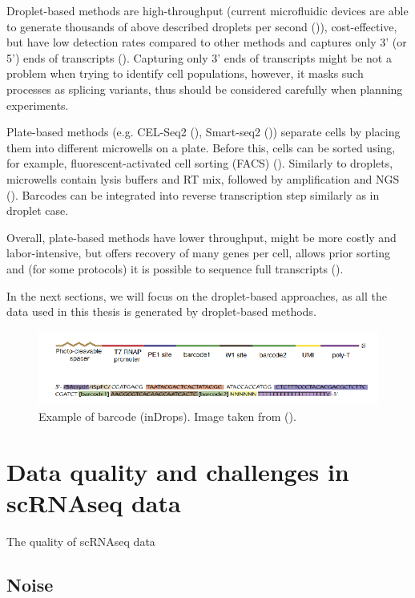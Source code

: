 Droplet-based methods are high-throughput
(current microfluidic devices are able to generate thousands of above described droplets per second (\cite{Prakadan2017})),
cost-effective, but have low detection rates compared to other methods and
captures only 3' (or 5') ends of transcripts (\cite{Heumos2023}).
Capturing only 3' ends of transcripts might be not a problem when trying to identify cell populations,
however, it masks such processes as splicing variants, thus should be considered carefully when planning experiments.

Plate-based methods (e.g. CEL-Seq2 (\cite{Hashimshony2016}), Smart-seq2 (\cite{Picelli2013}))
separate cells by placing them into different microwells on a plate.
Before this, cells can be sorted using, for example, fluorescent-activated cell sorting (FACS) (\cite{Heumos2023}).
Similarly to droplets, microwells contain lysis buffers and RT mix,
followed by amplification and NGS (\cite{Hashimshony2016}).
Barcodes can be integrated into reverse transcription step similarly as in droplet case.

Overall, plate-based methods have lower throughput, might be more costly and labor-intensive,
but offers recovery of many genes per cell, allows prior sorting and
(for some protocols) it is possible to sequence full transcripts (\cite{Heumos2023}).

In the next sections, we will focus on the droplet-based approaches,
as all the data used in this thesis is generated by droplet-based methods.

\begin{figure}
  \centering
  \includegraphics[width=\linewidth]{images/primer.png}
  \caption{Example of barcode (inDrops). Image taken from (\cite{Klein2015}).}
  \label{fig:primer}
\end{figure}

\section{Data quality and challenges in scRNAseq data}

The quality of scRNAseq data

\subsection{Noise}

